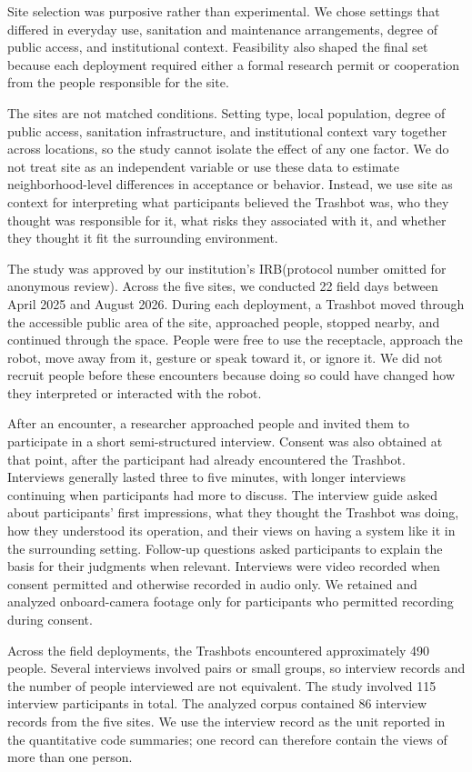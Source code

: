 Site selection was purposive rather than experimental. We chose settings that differed in everyday use, sanitation and maintenance arrangements, degree of public access, and institutional context. Feasibility also shaped the final set because each deployment required either a formal research permit or cooperation from the people responsible for the site. 

The sites are not matched conditions. Setting type, local population, degree of public access, sanitation infrastructure, and institutional context vary together across locations, so the study cannot isolate the effect of any one factor. We do not treat site as an independent variable or use these data to estimate neighborhood-level differences in acceptance or behavior. Instead, we use site as context for interpreting what participants believed the Trashbot was, who they thought was responsible for it, what risks they associated with it, and whether they thought it fit the surrounding environment.

The study was approved by our institution's IRB(protocol number omitted for anonymous review). Across the five sites, we conducted 22 field days between April 2025 and August 2026. During each deployment, a Trashbot moved through the accessible public area of the site, approached people, stopped nearby, and continued through the space. People were free to use the receptacle, approach the robot, move away from it, gesture or speak toward it, or ignore it. We did not recruit people before these encounters because doing so could have changed how they interpreted or interacted with the robot.

After an encounter, a researcher approached people and invited them to participate in a short semi-structured interview. Consent was also obtained at that point, after the participant had already encountered the Trashbot. Interviews generally lasted three to five minutes, with longer interviews continuing when participants had more to discuss. The interview guide asked about participants' first impressions, what they thought the Trashbot was doing, how they understood its operation, and their views on having a system like it in the surrounding setting. Follow-up questions asked participants to explain the basis for their judgments when relevant. Interviews were video recorded when consent permitted and otherwise recorded in audio only. We retained and analyzed onboard-camera footage only for participants who permitted recording during consent.

Across the field deployments, the Trashbots encountered approximately 490 people. Several interviews involved pairs or small groups, so interview records and the number of people interviewed are not equivalent. The study involved 115 interview participants in total. The analyzed corpus contained 86 interview records from the five sites. We use the interview record as the unit reported in the quantitative code summaries; one record can therefore contain the views of more than one person.

